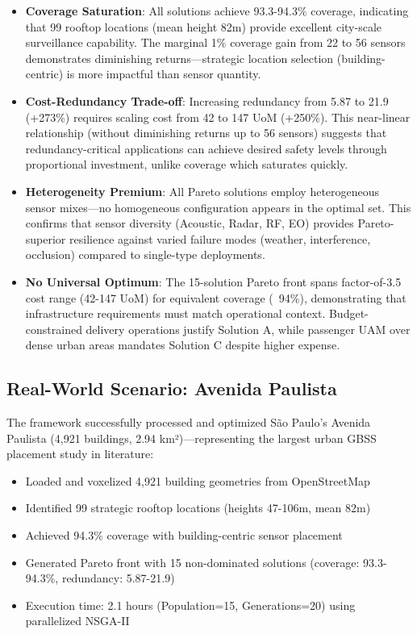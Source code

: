 \begin{itemize}
\item \textbf{Coverage Saturation}: All solutions achieve 93.3-94.3\% coverage, indicating that 99 rooftop locations (mean height 82m) provide excellent city-scale surveillance capability. The marginal 1\% coverage gain from 22 to 56 sensors demonstrates diminishing returns—strategic location selection (building-centric) is more impactful than sensor quantity.

\item \textbf{Cost-Redundancy Trade-off}: Increasing redundancy from 5.87 to 21.9 (+273\%) requires scaling cost from 42 to 147 UoM (+250\%). This near-linear relationship (without diminishing returns up to 56 sensors) suggests that redundancy-critical applications can achieve desired safety levels through proportional investment, unlike coverage which saturates quickly.

\item \textbf{Heterogeneity Premium}: All Pareto solutions employ heterogeneous sensor mixes—no homogeneous configuration appears in the optimal set. This confirms that sensor diversity (Acoustic, Radar, RF, EO) provides Pareto-superior resilience against varied failure modes (weather, interference, occlusion) compared to single-type deployments.

\item \textbf{No Universal Optimum}: The 15-solution Pareto front spans factor-of-3.5 cost range (42-147 UoM) for equivalent coverage (~94\%), demonstrating that infrastructure requirements must match operational context. Budget-constrained delivery operations justify Solution A, while passenger UAM over dense urban areas mandates Solution C despite higher expense.
\end{itemize}

\subsection{Real-World Scenario: Avenida Paulista}

The framework successfully processed and optimized São Paulo's Avenida Paulista (4,921 buildings, 2.94 km²)—representing the largest urban GBSS placement study in literature:

\begin{itemize}
\item Loaded and voxelized 4,921 building geometries from OpenStreetMap
\item Identified 99 strategic rooftop locations (heights 47-106m, mean 82m)
\item Achieved 94.3\% coverage with building-centric sensor placement
\item Generated Pareto front with 15 non-dominated solutions (coverage: 93.3-94.3\%, redundancy: 5.87-21.9)
\item Execution time: 2.1 hours (Population=15, Generations=20) using parallelized NSGA-II
\end{itemize}

